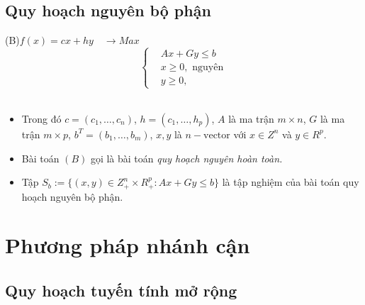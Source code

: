 \documentclass{beamer}
\begin{document}
\subsection{Quy hoạch nguyên bộ phận}
\begin{frame}
    \begin{center}                    
        \big(B\big)\quad $f(x)=cx+hy \quad \longrightarrow Max$ \\
        \[\left\{\begin{aligned}
            &Ax+Gy \leq  b \\
            &x\geq 0, \text{ nguyên} \\
            &y\geq 0,
        \end{aligned}\right.\]\\
    \end{center}
    \begin{itemize}
    \item Trong đó $c=(c_1,\ldots,c_n)$, $h=(c_1,\ldots,h_p)$, $A$ là ma trận $m\times n$, $G$ là ma trận $m\times p$, $b^T=(b_1,\ldots,b_m)$, $x, y$ là $n-\text{vector}$ với $x\in Z^n$ và $y\in R^p$.
    \item Bài toán $(B)$ gọi là bài toán \textit{quy hoạch nguyên hoàn toàn.}
    \item Tập $S_b:=\{(x,y)\in Z^n_+\times R^p_+: Ax+Gy\leq b\}$ là tập nghiệm của bài toán quy hoạch nguyên bộ phận.
    \end{itemize}
\end{frame}
\section{Phương pháp nhánh cận}
\subsection{Quy hoạch tuyến tính mở rộng}
\end{document}
